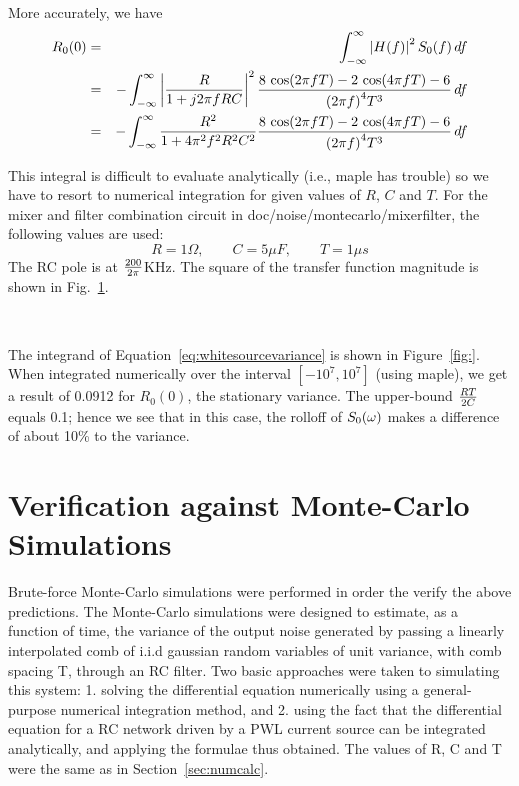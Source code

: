 More accurately, we have
\begin{eqnarray}
\label{eq:whitesourcevariance}
R_0(0) & = & \int_{-\infty}^\infty \left|H(f)\right|^2 S_0(f) \, df \nonumber \\
       & = & - \int_{-\infty}^\infty \left|{R\over 1+j2\pi fRC}\right|^2 {\frac
       {8\,\cos(2\pi f T)-2\,\cos(4\pi f T)-6}{{(2\pi f)}^{4}T^{3}}} \, df
       \nonumber\\
       & = & - \int_{-\infty}^\infty {R^2\over 1+4\pi^2 f^2R^2C^2}{\frac
       {8\,\cos(2\pi f T)-2\,\cos(4\pi f T)-6}{{(2\pi f)}^{4}T^{3}}} \, df 
\end{eqnarray}

This integral is difficult to evaluate analytically (i.e., {\sf maple} has
trouble) so we have to resort to numerical integration for given values of
$R$, $C$ and $T$. For the mixer and filter combination circuit in 
{\sf doc/noise/montecarlo/mixerfilter}, the following values are used:
\[
R=1\Omega, \qquad C=5\mu F,\qquad T=1\mu s
\]
The RC pole is at $200\over 2\pi$KHz. The square of the transfer function
magnitude is shown in Fig.~\ref{fig:magH2}.
\begin{figure}[htbp]
\centerline{\ }
\caption{}
\label{fig:magH2}
\end{figure}
The integrand of Equation~\ref{eq:whitesourcevariance} is shown in
Figure~\ref{fig:}. When integrated numerically  over the interval $[-10^7,
10^7]$ (using {\sf maple}), we get a result of 0.0912 for $R_0(0)$, the
stationary variance. The upper-bound $R T \over 2 C$ equals 0.1;
hence we see that in this case, the rolloff of $S_0(\omega)$ makes a difference of
about 10\% to the variance.

\section{Verification against Monte-Carlo Simulations}
\label{sec:montecarlo}

Brute-force Monte-Carlo simulations were performed in order the verify the
above predictions. The Monte-Carlo simulations were designed to estimate, as
a function of time, the variance of the output noise generated by passing a
linearly interpolated comb of i.i.d gaussian random variables of unit
variance, with comb spacing T, through an RC filter. Two basic approaches
were taken to simulating this system: 1. solving the differential equation
numerically using a general-purpose numerical integration method, and 2.
using the fact that the differential equation for a RC network driven by a
PWL current source can be integrated analytically, and applying the formulae
thus obtained. The values of R, C and T were the same as in
Section~\ref{sec:numcalc}.

